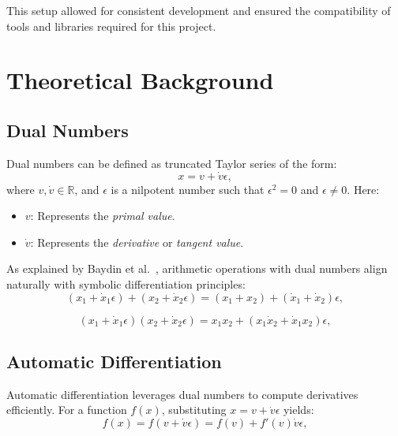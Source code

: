 \documentclass[a4paper,12pt]{article}
\begin{document}
This setup allowed for consistent development and ensured the compatibility of tools and libraries required for this project.

\section{Theoretical Background}

\subsection{Dual Numbers}
Dual numbers can be defined as truncated Taylor series of the form:
\begin{equation}
    x = v + \dot{v}\epsilon,
    \label{eq:dual_number_form}
    \end{equation}
where \(v, \dot{v} \in \mathbb{R}\), and \(\epsilon\) is a nilpotent number such that \(\epsilon^2 = 0\) and \(\epsilon \neq 0\). Here:
\begin{itemize}
    \item \(v\): Represents the \textit{primal value}.
    \item \(\dot{v}\): Represents the \textit{derivative} or \textit{tangent value}.
\end{itemize}

As explained by Baydin et al.~\cite{baydin2018automatic}, arithmetic operations with dual numbers align naturally with symbolic differentiation principles:
\begin{equation}
    (x_1 + \dot{x}_1\epsilon) + (x_2 + \dot{x}_2\epsilon) = (x_1 + x_2) + (\dot{x}_1 + \dot{x}_2)\epsilon,
    \label{eq:dual_addition}
    \end{equation}
    
    \begin{equation}
    (x_1 + \dot{x}_1\epsilon)(x_2 + \dot{x}_2\epsilon) = x_1x_2 + (x_1\dot{x}_2 + \dot{x}_1x_2)\epsilon,
    \label{eq:dual_multiplication}
    \end{equation}
    

\subsection{Automatic Differentiation}
Automatic differentiation leverages dual numbers to compute derivatives efficiently. For a function \(f(x)\), substituting \(x = v + \dot{v}\epsilon\) yields:
\begin{equation}
    f(x) = f(v + \dot{v}\epsilon) = f(v) + f'(v)\dot{v}\epsilon,
    \label{eq:dual_function}
    \end{equation}
    
\end{document}
